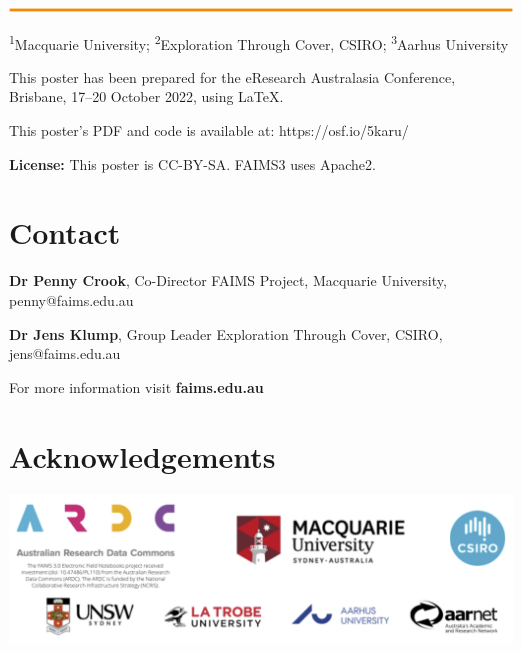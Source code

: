 \documentclass[a0,portrait]{a0poster}
\begin{document}
\vfill
\hspace{-6cm}\includegraphics[width=1.1\paperwidth]{figures/a0-faimsorange-footer.png}
\begin{multicols}{3}




\textsuperscript{1}Macquarie University; \textsuperscript{2}Exploration Through Cover, CSIRO; \textsuperscript{3}Aarhus University 

\vfill

This poster has been prepared for the eResearch Australasia Conference, Brisbane, 17–20 October 2022, using \LaTeX{}.

\vfill

This poster's PDF and code is available at: https://osf.io/5karu/

\vfill

\textbf{License:} This poster is CC-BY-SA. FAIMS3 uses Apache2. 




\section*{Contact}
\begingroup
\setlength{\columnsep}{25pt}
\begin{figure}
\centering
\vspace{3.5mm}
\end{figure}


\textbf{Dr Penny Crook}, Co-Director FAIMS Project, Macquarie University, penny@faims.edu.au

\textbf{Dr Jens Klump}, Group Leader Exploration Through Cover, CSIRO, jens@faims.edu.au

For more information visit \textbf{faims.edu.au}
\endgroup

\columnbreak

\section*{Acknowledgements}

\begin{center}

\includegraphics[width=\linewidth]{figures/FAIMS-keypartners.png}
\end{center}

\end{multicols}
\end{document}
